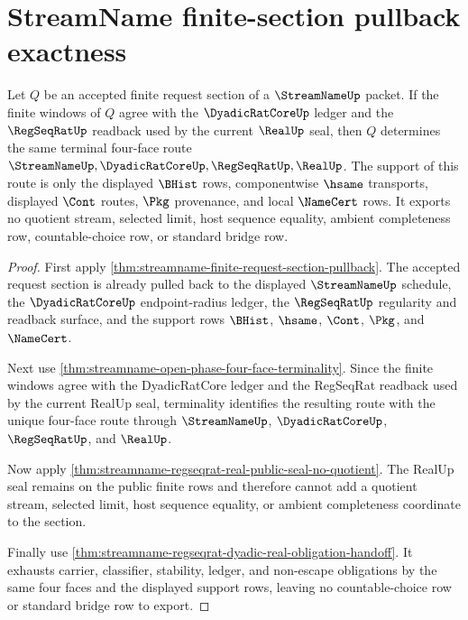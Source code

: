\section{StreamName finite-section pullback exactness}
\label{sec:streamname-finite-section-pullback-exactness}

\begin{theorem}
\label{thm:streamname-finite-section-pullback-exactness}
Let $Q$ be an accepted finite request section of a $\StreamNameUp$ packet. If
the finite windows of $Q$ agree with the $\DyadicRatCoreUp$ ledger and the
$\RegSeqRatUp$ readback used by the current $\RealUp$ seal, then $Q$
determines the same terminal four-face route
$\StreamNameUp,\DyadicRatCoreUp,\RegSeqRatUp,\RealUp$. The support of this
route is only the displayed $\BHist$ rows, componentwise $\hsame$ transports,
displayed $\Cont$ routes, $\Pkg$ provenance, and local $\NameCert$ rows. It
exports no quotient stream, selected limit, host sequence equality, ambient
completeness row, countable-choice row, or standard bridge row.
\end{theorem}
\begin{proof}
First apply \autoref{thm:streamname-finite-request-section-pullback}. The
accepted request section is already pulled back to the displayed
$\StreamNameUp$ schedule, the $\DyadicRatCoreUp$ endpoint-radius ledger, the
$\RegSeqRatUp$ regularity and readback surface, and the support rows
$\BHist$, $\hsame$, $\Cont$, $\Pkg$, and $\NameCert$.

Next use \autoref{thm:streamname-open-phase-four-face-terminality}. Since the
finite windows agree with the DyadicRatCore ledger and the RegSeqRat readback
used by the current RealUp seal, terminality identifies the resulting route
with the unique four-face route through $\StreamNameUp$, $\DyadicRatCoreUp$,
$\RegSeqRatUp$, and $\RealUp$.

Now apply \autoref{thm:streamname-regseqrat-real-public-seal-no-quotient}. The
RealUp seal remains on the public finite rows and therefore cannot add a
quotient stream, selected limit, host sequence equality, or ambient
completeness coordinate to the section.

Finally use \autoref{thm:streamname-regseqrat-dyadic-real-obligation-handoff}.
It exhausts carrier, classifier, stability, ledger, and non-escape obligations
by the same four faces and the displayed support rows, leaving no
countable-choice row or standard bridge row to export.
\end{proof}

